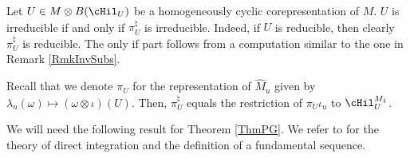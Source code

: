 \begin{rmk}\label{RmkIr}
Let $U \in M \otimes B(\cHil_U)$ be a homogeneously cyclic corepresentation of $M$. $U$ is irreducible if and only if $\pi_U^\natural$ is irreducible. Indeed, if $U$ is reducible, then clearly $\pi_U^\natural$ is reducible. The only if part follows from a computation similar to the one in Remark \ref{RmkInvSubs}.
\end{rmk}

 Recall that we denote $\pi_U$ for the representation of $\hat{M}_u$ given by $\lambda_u(\omega) \mapsto (\omega \otimes \iota)(U)$. Then, $\pi_U^\natural$ equals the restriction of $\pi_U \iota_u$ to $\cHil_U^{M_1}$.

We will need the following result for Theorem \ref{ThmPG}. We refer to \cite{DixVNA} for the theory of direct integration and the def\/inition of a fundamental sequence.


